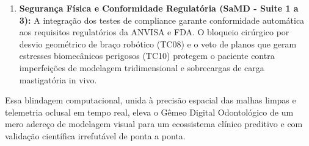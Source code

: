 \begin{enumerate}
    \item \textbf{Segurança Física e Conformidade Regulatória (SaMD - Suite 1 a 3):} A integração dos testes de compliance garante conformidade automática aos requisitos regulatórios da ANVISA e FDA. O bloqueio cirúrgico por desvio geométrico de braço robótico (TC08) e o veto de planos que geram estresses biomecânicos perigosos (TC10) protegem o paciente contra imperfeições de modelagem tridimensional e sobrecargas de carga mastigatória in vivo.
\end{enumerate}

Essa blindagem computacional, unida à precisão espacial das malhas limpas e telemetria oclusal em tempo real, eleva o Gêmeo Digital Odontológico de um mero adereço de modelagem visual para um ecossistema clínico preditivo e com validação científica irrefutável de ponta a ponta.
